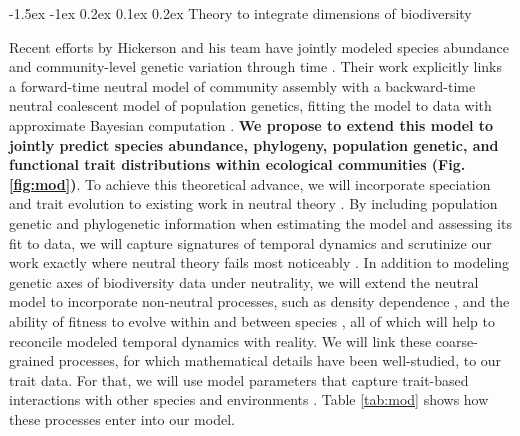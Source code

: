 \documentclass[11pt]{article}
\makeatletter
\renewcommand\subsubsection{\@startsection{subsection}{1}{\z@}%
                                  {-1.5ex \@plus -1ex \@minus 0.2ex}%
                                  {0.1ex \@plus 0.2ex}%
                                  {\normalfont\bfseries}}
\makeatother
\begin{document}
\subsubsection{Theory to integrate dimensions of
biodiversity}\label{theory-to-integrate-dimensions-of-biodiversity}

Recent efforts by Hickerson and his team have jointly modeled species
abundance and community-level genetic variation through time
\cite{Overcast_undated-op}. Their work explicitly links a forward-time
neutral model of community assembly with a backward-time neutral
coalescent model of population genetics, fitting the model to data with
approximate Bayesian computation \citep[ABC;][]{Beaumont2010-si}.
\textbf{We propose to extend this model to jointly predict species
abundance, phylogeny, population genetic, and functional trait
distributions within ecological communities (Fig.
\ref{fig:mod})}. To achieve this theoretical advance, we will
incorporate speciation \cite{Rosindell2010-gq} and trait evolution to
existing work in neutral theory \cite{Rosindell2011-od,Etienne2007-we}.
By including population genetic and phylogenetic information when
estimating the model and assessing its fit to data, we will capture
signatures of temporal dynamics and scrutinize our work exactly where
neutral theory fails most noticeably \cite{Ricklefs2006-tn}. In addition
to modeling genetic axes of biodiversity data under neutrality, we will
extend the neutral model to incorporate non-neutral processes, such as
density dependence \cite{Haegeman2017-kf}, and the ability of fitness to
evolve within and between species \cite{Rosindell2015-gp}, all of which
will help to reconcile modeled temporal dynamics with reality. We will
link these coarse-grained processes, for which mathematical details have
been well-studied, to our trait data. For that, we will use model
parameters that capture trait-based interactions with other species
\cite{Grilli2017-ot,HilleRisLambers2012-xt} and environments
\cite{Adler2010-ad,Jabot2008-ms,Tuomisto2003-kf}. Table \ref{tab:mod}
shows how these processes enter into our model.
\end{document}
